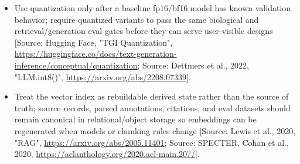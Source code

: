 \documentclass[11pt]{report}
\begin{document}
\begin{itemize}
\item Use quantization only after a baseline fp16/bf16 model has known validation behavior; require quantized variants to pass the same biological and retrieval/generation eval gates before they can serve user-visible designs [Source: Hugging Face, "TGI Quantization", \url{https://huggingface.co/docs/text-generation-inference/conceptual/quantization}; Source: Dettmers et al., 2022, "LLM.int8()", \url{https://arxiv.org/abs/2208.07339}].
\item Treat the vector index as rebuildable derived state rather than the source of truth; source records, parsed annotations, citations, and eval datasets should remain canonical in relational/object storage so embeddings can be regenerated when models or chunking rules change [Source: Lewis et al., 2020, "RAG", \url{https://arxiv.org/abs/2005.11401}; Source: SPECTER, Cohan et al., 2020, \url{https://aclanthology.org/2020.acl-main.207/}].
\end{itemize}
\end{document}
